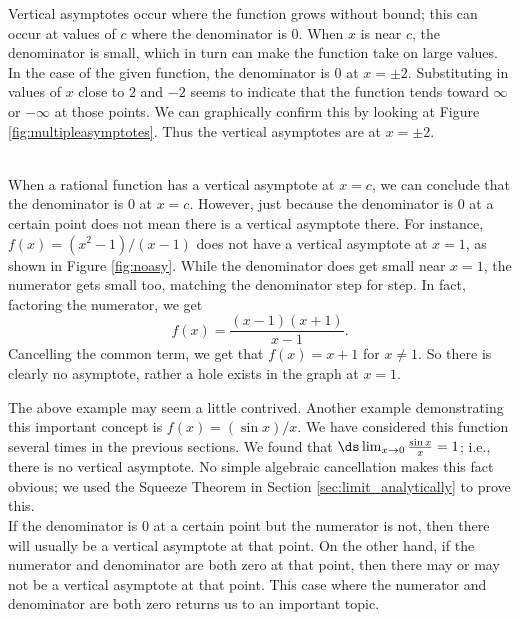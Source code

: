 {Vertical asymptotes occur where the function grows without bound; this can occur at values of $c$ where the denominator is 0. When $x$ is near $c$, the denominator is small, which in turn can make the function take on large values.  In the case of the given function, the denominator is 0 at $x=\pm 2$.  Substituting in values of $x$ close to $2$ and $-2$ seems to indicate that the function tends toward $\infty$ or $-\infty$ at those points.  We can graphically confirm this by looking at Figure \ref{fig:multipleasymptotes}. Thus the vertical asymptotes are at $x=\pm2$.

}\\

When a rational function has a vertical asymptote at $x=c$, we can conclude that the denominator is 0 at $x=c$. However, just because the denominator is 0 at a certain point does not mean there is a vertical asymptote there.  For instance, $f(x)=(x^2-1)/(x-1)$ does not have a vertical asymptote at $x=1$, as shown in Figure \ref{fig:noasy}.  While the denominator does get small near $x=1$, the numerator gets small too, matching the denominator step for step. In fact, factoring the numerator, we get
\[
f(x)=\frac{(x-1)(x+1)}{x-1}.
\]
Cancelling the common term, we get that $f(x)=x+1$ for $x\not=1$.   So there is clearly no asymptote, rather a hole exists in the graph at $x=1$.\\


The above example may seem a little contrived.  Another example demonstrating this important concept is $f(x)= (\sin x)/x$. We have considered this function several times in the previous sections. We found that $\ds \lim_{x\to0}\frac{\sin x}{x}=1$; i.e., there is no vertical asymptote. No simple algebraic cancellation makes this fact obvious; we used the Squeeze Theorem in Section \ref{sec:limit_analytically} to prove this.\\

If the denominator is 0 at a certain point but the numerator is not, then there will usually be a vertical asymptote at that point.  On the other hand,  if the numerator and denominator are both zero at that point, then there may or may not be a vertical asymptote at that point.  This case where the numerator and denominator are both zero returns us to an important topic.

